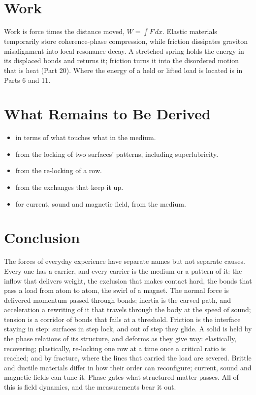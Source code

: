 \documentclass[11pt,a4paper]{article}
\begin{document}
\section{Work}

Work is force times the distance moved, $W=\int F\,dx$. Elastic materials temporarily store coherence-phase compression, while friction dissipates graviton misalignment into local resonance decay. A stretched spring holds the energy in its displaced bonds and returns it; friction turns it into the disordered motion that is heat (Part 20). Where the energy of a held or lifted load is located is in Parts 6 and 11.

\section{What Remains to Be Derived}

\begin{itemize}
\item {} in terms of what touches what in the medium.
\item {} from the locking of two surfaces' patterns, including superlubricity.
\item {} from the re-locking of a row.
\item {} from the exchanges that keep it up.
\item {} for current, sound and magnetic field, from the medium.
\end{itemize}

\section*{Conclusion}

The forces of everyday experience have separate names but not separate causes. Every one has a carrier, and every carrier is the medium or a pattern of it: the inflow that delivers weight, the exclusion that makes contact hard, the bonds that pass a load from atom to atom, the swirl of a magnet. The normal force is delivered momentum passed through bonds; inertia is the carved path, and acceleration a rewriting of it that travels through the body at the speed of sound; tension is a corridor of bonds that fails at a threshold. Friction is the interface staying in step: surfaces in step lock, and out of step they glide. A solid is held by the phase relations of its structure, and deforms as they give way: elastically, recovering; plastically, re-locking one row at a time once a critical ratio is reached; and by fracture, where the lines that carried the load are severed. Brittle and ductile materials differ in how their order can reconfigure; current, sound and magnetic fields can tune it. Phase gates what structured matter passes. All of this is field dynamics, and the measurements bear it out.
\end{document}

